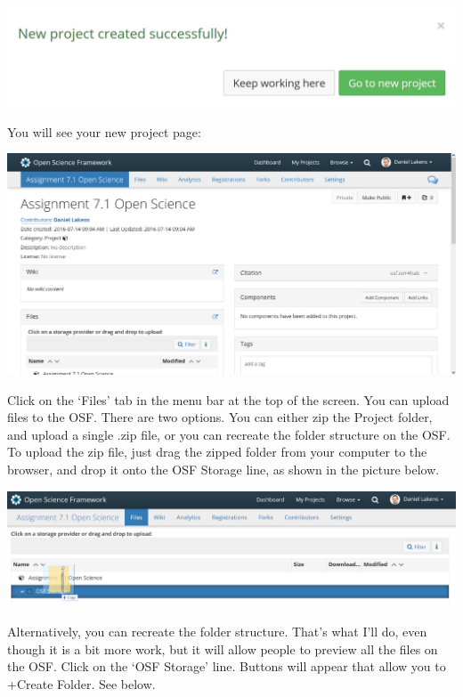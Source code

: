 \documentclass[
  oneside]{book}
\begin{document}
\begin{center}\includegraphics[width=1\linewidth]{images/34c3f0068911af6749513b1584c4cac7} \end{center}

You will see your new project page:

\begin{center}\includegraphics[width=1\linewidth]{images/661cad8c112cd6c52562bed3cf6a5cd5} \end{center}

Click on the `Files' tab in the menu bar at the top of the screen. You can upload files to the OSF. There are two options. You can either zip the Project folder, and upload a single .zip file, or you can recreate the folder structure on the OSF. To upload the zip file, just drag the zipped folder from your computer to the browser, and drop it onto the OSF Storage line, as shown in the picture below.

\begin{center}\includegraphics[width=1\linewidth]{images/8b43efb2aa9c69d3e8786473113660ba} \end{center}

Alternatively, you can recreate the folder structure. That's what I'll do, even though it is a bit more work, but it will allow people to preview all the files on the OSF. Click on the `OSF Storage' line. Buttons will appear that allow you to +Create Folder. See below.
\end{document}
